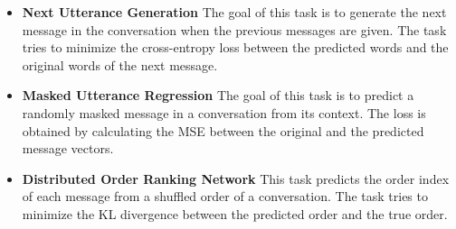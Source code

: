 \documentclass[letterpaper]{article} %
\newcommand{\kibitz}[2]{\ifnum\Comments=1{\textcolor{#1}{#2}}\fi}
\newcommand{\kg}[1]{\kibitz{red}{[KG:#1]}}
\begin{document}
\begin{itemize}
    \item \textbf{Next Utterance Generation}  The goal of this task is to generate the next message in the conversation when the previous messages are given. The task tries to minimize the cross-entropy loss between the predicted words and the original words of the next message.

    \item \textbf{Masked Utterance Regression}  The goal of this task is to predict a randomly masked message in a conversation from its context. The loss is obtained by calculating the MSE between the original and the predicted message vectors.

    \item \textbf{Distributed Order Ranking Network} This task predicts the order index of each message from a shuffled order of a conversation. The task tries to minimize the KL divergence between the predicted order and the true order.
\end{itemize}



\end{document}
